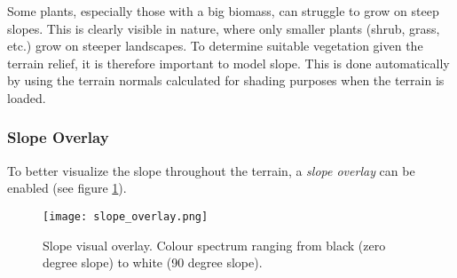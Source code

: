 Some plants, especially those with a big biomass, can struggle to grow on steep slopes. This is clearly visible in nature, where only smaller plants (shrub, grass, etc.) grow on steeper landscapes. To determine suitable vegetation given the terrain relief, it is therefore important to model slope. This is done automatically by using the terrain normals calculated for shading purposes when the terrain is loaded.

\subsubsection{Slope Overlay}

To better visualize the slope throughout the terrain, a \textit{slope overlay} can be enabled (see figure \ref{fig:slope overlay}).

\begin{figure}
\center
	\texttt{[image: slope\_overlay.png]}
	\caption{ Slope visual overlay. Colour spectrum ranging from black (zero degree slope) to white (90 degree slope). }
	\label{fig:slope overlay}
\end{figure}